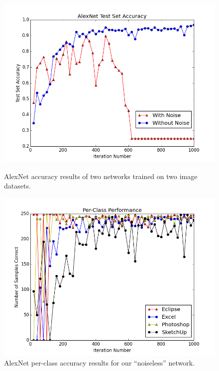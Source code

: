 \documentclass[10pt]{article}
\begin{document}
\begin{figure}[t]
\centering
  \begin{minipage}{.4\textwidth}
  \centering
  \includegraphics[width=1\linewidth]{AlexNet_Accuracy1000}
  \caption{AlexNet accuracy results of two networks trained on two image datasets.}
  \label{fig:alex_net}
  \end{minipage}\hfill
  \begin{minipage}{.4\textwidth}
  \centering
  \includegraphics[width=1\linewidth]{PerClassPerformance1000}
  \caption{AlexNet per-class accuracy results for our ``noiseless'' network.}
  \label{fig:per_class}
  \end{minipage}
\end{figure}
\end{document}
